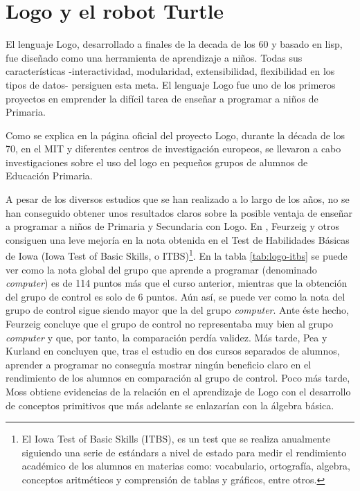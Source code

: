 {{\section{Logo y el robot Turtle}
\label{sec:Logo}

El lenguaje Logo, desarrollado a finales de la decada de los 60 y basado en \Gls{lisp}, fue diseñado como una herramienta de aprendizaje a niños. Todas sus características -interactividad, modularidad, extensibilidad, flexibilidad en los tipos de datos- persiguen esta meta. El lenguaje Logo fue uno de los primeros proyectos en emprender la difícil tarea de enseñar a programar a niños de Primaria.


Como se explica en la página oficial del proyecto Logo\cite{logo}, durante la década de los 70, en el \acrfull{MIT} y diferentes centros de investigación europeos, se llevaron a cabo investigaciones sobre el uso del \Gls{logo} en pequeños grupos de alumnos de Educación Primaria.

A pesar de los diversos estudios que se han realizado a lo largo de los años, no se han conseguido obtener unos resultados claros sobre la posible ventaja de enseñar a programar a niños de Primaria y Secundaria con Logo. En \cite{feurzeig1969programming}, Feurzeig y otros consiguen una leve mejoría en la nota obtenida en el Test de Habilidades Básicas de Iowa (Iowa Test of Basic Skills, o ITBS)\footnote{El Iowa Test of Basic Skills (ITBS), es un test que se realiza anualmente siguiendo una serie de estándars a nivel de estado para medir el rendimiento académico de los alumnos en materias como: vocabulario, ortografía, algebra, conceptos aritméticos y comprensión de tablas y gráficos, entre otros.}. En la tabla \ref{tab:logo-itbs} se puede ver como la nota global del grupo que aprende a programar (denominado \emph{computer}) es de 114 puntos más que el curso anterior, mientras que la obtención del grupo de control es solo de 6 puntos. Aún así, se puede ver como la nota del grupo de control sigue siendo mayor que la del grupo \emph{computer}. Ante éste hecho, Feurzeig concluye que el grupo de control no representaba muy bien al grupo \emph{computer} y que, por tanto, la comparación perdía validez.
Más tarde, Pea y Kurland en \cite{pea1984logo} concluyen que, tras el estudio en dos cursos separados de alumnos, aprender a programar no conseguía mostrar ningún beneficio claro en el rendimiento de los alumnos en comparación al grupo de control.
Poco más tarde, Moss \cite{moss1985creating} obtiene evidencias de la relación en el aprendizaje de Logo con el desarrollo de conceptos primitivos que más adelante se enlazarían con la álgebra básica.


}}
